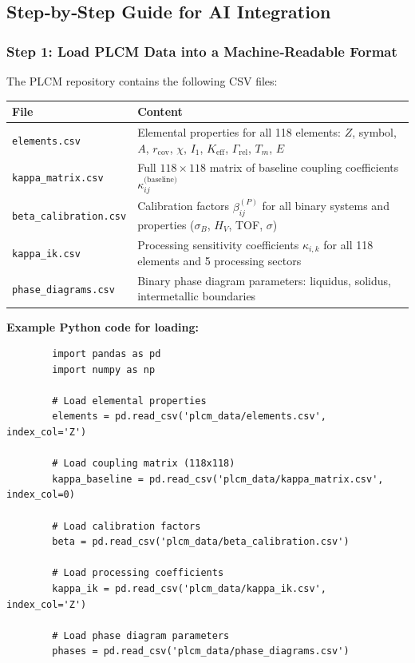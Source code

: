 \documentclass[12pt,a4paper]{article}
\newcommand{\Keff}{K_{\mathrm{eff}}}
\begin{document}
	\subsection{Step‑by‑Step Guide for AI Integration}
	
	\subsubsection{Step 1: Load PLCM Data into a Machine‑Readable Format}
	
	The PLCM repository contains the following CSV files:
	
	\begin{longtable}{p{4cm} p{10cm}}
		\toprule
		\textbf{File} & \textbf{Content} \\
		\midrule
		\texttt{elements.csv} & Elemental properties for all 118 elements: \(Z\), symbol, \(A\), \(r_{\text{cov}}\), \(\chi\), \(I_1\), \(\Keff\), \(\Gamma_{\text{rel}}\), \(T_m\), \(E\) \\
		\texttt{kappa\_matrix.csv} & Full \(118\times118\) matrix of baseline coupling coefficients \(\kappa_{ij}^{\text{(baseline)}}\) \\
		\texttt{beta\_calibration.csv} & Calibration factors \(\beta_{ij}^{(P)}\) for all binary systems and properties (\(\sigma_B\), \(H_V\), TOF, \(\sigma\)) \\
		\texttt{kappa\_ik.csv} & Processing sensitivity coefficients \(\kappa_{i,k}\) for all 118 elements and 5 processing sectors \\
		\texttt{phase\_diagrams.csv} & Binary phase diagram parameters: liquidus, solidus, intermetallic boundaries \\
		\bottomrule
	\end{longtable}
	
	\textbf{Example Python code for loading:}
	
	\begin{verbatim}
		import pandas as pd
		import numpy as np
		
		# Load elemental properties
		elements = pd.read_csv('plcm_data/elements.csv', index_col='Z')
		
		# Load coupling matrix (118x118)
		kappa_baseline = pd.read_csv('plcm_data/kappa_matrix.csv', index_col=0)
		
		# Load calibration factors
		beta = pd.read_csv('plcm_data/beta_calibration.csv')
		
		# Load processing coefficients
		kappa_ik = pd.read_csv('plcm_data/kappa_ik.csv', index_col='Z')
		
		# Load phase diagram parameters
		phases = pd.read_csv('plcm_data/phase_diagrams.csv')
	\end{verbatim}
	
\end{document}
